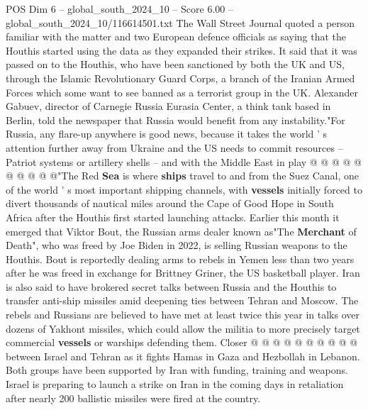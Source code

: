 \begin{textsample}{POS Dim 6 – global\_south\_2024\_10 – Score 6.00 – global\_south\_2024\_10/116614501.txt}
The Wall Street Journal quoted a person familiar with the matter and two European defence officials as saying that the Houthis started using the data as they expanded their strikes.
It said that it was passed on to the Houthis, who have been sanctioned by both the UK and US, through the Islamic Revolutionary Guard Corps, a branch of the Iranian Armed Forces which some want to see banned as a terrorist group in the UK.
Alexander Gabuev, director of Carnegie Russia Eurasia Center, a think tank based in Berlin, told the newspaper that Russia would benefit from any instability."For Russia, any flare-up anywhere is good news, because it takes the world ' s attention further away from Ukraine and the US needs to commit resources -- Patriot systems or artillery shells -- and with the Middle East in play @ @ @ @ @ @ @ @ @ @"The Red \textbf{Sea} is where \textbf{ships} travel to and from the Suez Canal, one of the world ' s most important shipping channels, with \textbf{vessels} initially forced to divert thousands of nautical miles around the Cape of Good Hope in South Africa after the Houthis first started launching attacks.
Earlier this month it emerged that Viktor Bout, the Russian arms dealer known as"The \textbf{Merchant} of Death", who was freed by Joe Biden in 2022, is selling Russian weapons to the Houthis.
Bout is reportedly dealing arms to rebels in Yemen less than two years after he was freed in exchange for Brittney Griner, the US basketball player.
Iran is also said to have brokered secret talks between Russia and the Houthis to transfer anti-ship missiles amid deepening ties between Tehran and Moscow.
The rebels and Russians are believed to have met at least twice this year in talks over dozens of Yakhont missiles, which could allow the militia to more precisely target commercial \textbf{vessels} or warships defending them.
Closer @ @ @ @ @ @ @ @ @ @ between Israel and Tehran as it fights Hamas in Gaza and Hezbollah in Lebanon.
Both groups have been supported by Iran with funding, training and weapons.
Israel is preparing to launch a strike on Iran in the coming days in retaliation after nearly 200 ballistic missiles were fired at the country.

\end{textsample}
